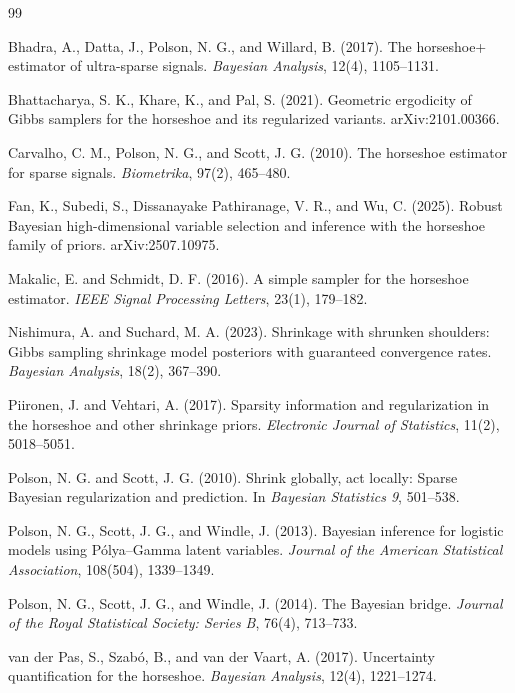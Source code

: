 \documentclass[11pt]{article}
\begin{document}
\begin{thebibliography}{99}

Bhadra, A., Datta, J., Polson, N. G., and Willard, B. (2017).
\newblock The horseshoe+ estimator of ultra-sparse signals.
\newblock \emph{Bayesian Analysis}, 12(4), 1105--1131.

Bhattacharya, S. K., Khare, K., and Pal, S. (2021).
\newblock Geometric ergodicity of Gibbs samplers for the horseshoe and its regularized variants.
\newblock arXiv:2101.00366.

Carvalho, C. M., Polson, N. G., and Scott, J. G. (2010).
\newblock The horseshoe estimator for sparse signals.
\newblock \emph{Biometrika}, 97(2), 465--480.

Fan, K., Subedi, S., Dissanayake Pathiranage, V. R., and Wu, C. (2025).
\newblock Robust Bayesian high-dimensional variable selection and inference with the horseshoe family of priors.
\newblock arXiv:2507.10975.

Makalic, E. and Schmidt, D. F. (2016).
\newblock A simple sampler for the horseshoe estimator.
\newblock \emph{IEEE Signal Processing Letters}, 23(1), 179--182.

Nishimura, A. and Suchard, M. A. (2023).
\newblock Shrinkage with shrunken shoulders: Gibbs sampling shrinkage model posteriors with guaranteed convergence rates.
\newblock \emph{Bayesian Analysis}, 18(2), 367--390.

Piironen, J. and Vehtari, A. (2017).
\newblock Sparsity information and regularization in the horseshoe and other shrinkage priors.
\newblock \emph{Electronic Journal of Statistics}, 11(2), 5018--5051.

Polson, N. G. and Scott, J. G. (2010).
\newblock Shrink globally, act locally: Sparse Bayesian regularization and prediction.
\newblock In \emph{Bayesian Statistics 9}, 501--538.

Polson, N. G., Scott, J. G., and Windle, J. (2013).
\newblock Bayesian inference for logistic models using P\'olya--Gamma latent variables.
\newblock \emph{Journal of the American Statistical Association}, 108(504), 1339--1349.

Polson, N. G., Scott, J. G., and Windle, J. (2014).
\newblock The Bayesian bridge.
\newblock \emph{Journal of the Royal Statistical Society: Series B}, 76(4), 713--733.

van der Pas, S., Szab\'o, B., and van der Vaart, A. (2017).
\newblock Uncertainty quantification for the horseshoe.
\newblock \emph{Bayesian Analysis}, 12(4), 1221--1274.

\end{thebibliography}
\end{document}
